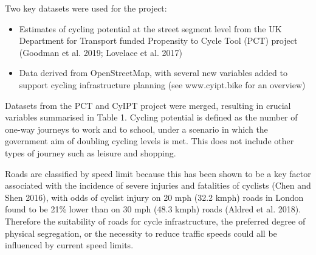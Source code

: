 \documentclass[
]{article}
\providecommand{\tightlist}{%
  \setlength{\itemsep}{0pt}\setlength{\parskip}{0pt}}
\begin{document}
Two key datasets were used for the project:

\begin{itemize}
\tightlist
\item
  Estimates of cycling potential at the street segment level from the UK Department for Transport funded Propensity to Cycle Tool (PCT) project (Goodman et al. 2019; Lovelace et al. 2017)
\item
  Data derived from OpenStreetMap, with several new variables added to support cycling infrastructure planning (see www.cyipt.bike for an overview)
\end{itemize}

Datasets from the PCT and CyIPT project were merged, resulting in crucial variables summarised in Table 1.
Cycling potential is defined as the number of one-way journeys to work and to school, under a scenario in which the government aim of doubling cycling levels is met.
This does not include other types of journey such as leisure and shopping.

Roads are classified by speed limit because this has been shown to be a key factor associated with the incidence of severe injuries and fatalities of cyclists (Chen and Shen 2016), with odds of cyclist injury on 20 mph (32.2 kmph) roads in London found to be 21\% lower than on 30 mph (48.3 kmph) roads (Aldred et al. 2018).
Therefore the suitability of roads for cycle infrastructure, the preferred degree of physical segregation, or the necessity to reduce traffic speeds could all be influenced by current speed limits.
\end{document}
